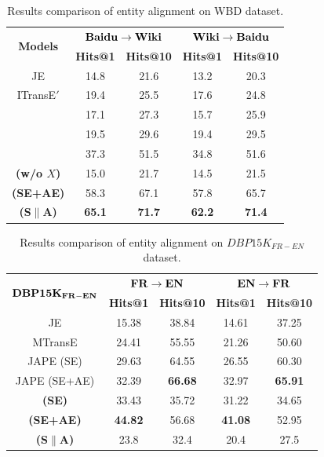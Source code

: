 \begin{table}
	\centering
	\scriptsize
	\begin{tabular}{c|cc|cc}
		\toprule
		\multirow{2}{*}{\bf Models} &  \multicolumn{2}{c|}{$\bf Baidu \rightarrow Wiki$} & \multicolumn{2}{c}{$\bf Wiki \rightarrow Baidu$} \\
		& \bf Hits@1 & \bf Hits@10 & \bf Hits@1 & \bf Hits@10 \\
		\midrule
		JE & 14.8 & 21.6 & 13.2 & 20.3 \\
		ITransE$'$ & 19.4 & 25.5 & 17.6 & 24.8 \\
		\GCN & 17.1 & 27.3 & 15.7 & 25.9 \\
		\HGCN & 19.5 & 29.6 & 19.4 & 29.5  \\
		\bf \RGCN & 37.3 & 51.5 & 34.8 & 51.6 \\
		\bf \HRGCN (w/o $X$) & 15.0 & 21.7 & 14.5 & 21.5 \\
		\bf \HRGCN (SE+AE) & 58.3 & 67.1 & 57.8{\tiny } & 65.7 \\
		\bf \HRGCN (S$\|$A) & \bf 65.1 & \bf 71.7 & \bf 62.2 & \bf 71.4\\ 
		\bottomrule
	\end{tabular}
	\caption{Results comparison of entity alignment on WBD dataset.}
	\label{f1}
\end{table}

\begin{table}
	\centering
	\scriptsize
	\begin{tabular}{c|cc|cc}
		\toprule
		\multirow{2}{*}{$\bf DBP15K_{FR-EN}$} & \multicolumn{2}{c|}{$\bf FR \rightarrow EN$} & \multicolumn{2}{c}{$\bf EN \rightarrow FR$} \\
		& \bf Hits@1 & \bf Hits@10 & \bf Hits@1 & \bf Hits@10 \\
		\midrule
		JE & 15.38 & 38.84 & 14.61 & 37.25 \\
		\midrule
		MTransE & 24.41 & 55.55 & 21.26 & 50.60 \\
		\midrule
		JAPE (SE) & 29.63 & 64.55 & 26.55 & 60.30 \\
		JAPE (SE+AE) & 32.39 & \bf 66.68 & 32.97 & \bf 65.91 \\
		\midrule
		\bf \HRGCN (SE) & 33.43& 35.72& 31.22& 34.65 \\
		\bf \HRGCN (SE+AE) & \bf 44.82 & 56.68 &\bf 41.08 & 52.95 \\
		\bf \HRGCN (S$\|$A) & 23.8 & 32.4 & 20.4 & 27.5 \\ 
		\bottomrule
	\end{tabular}
	\caption{Results comparison of entity alignment on $DBP15K_{FR-EN}$ dataset.}
	\label{cross}
\end{table}






